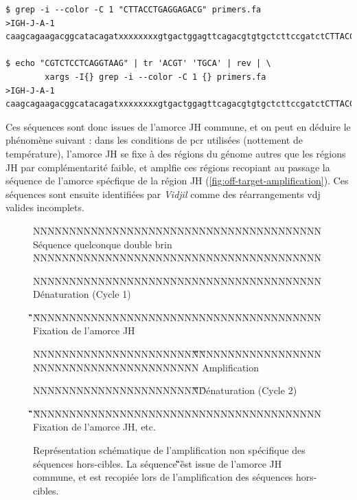 \begin{lstlisting}[language=custombash, 
caption={Commande Bash et résultat de la recherche des séquences dans les amorces dégénérées.},
label={lst:bash-search-primer},
basicstyle=\ttfamily\scriptsize]
$ grep -i --color -C 1 "CTTACCTGAGGAGACG" primers.fa
>IGH-J-A-1
caagcagaagacggcatacagatxxxxxxxxgtgactggagttcagacgtgtgctcttccgatctCTTACCTGAGGAGACGgtgacc

$ echo "CGTCTCCTCAGGTAAG" | tr 'ACGT' 'TGCA' | rev | \
        xargs -I{} grep -i --color -C 1 {} primers.fa
>IGH-J-A-1
caagcagaagacggcatacagatxxxxxxxxgtgactggagttcagacgtgtgctcttccgatctCTTACCTGAGGAGACGgtgacc
\end{lstlisting}

\vspace{1em}

Ces séquences sont donc issues de l'amorce JH commune, et on peut en déduire le phénomène suivant :
dans les conditions de \gls{pcr} utilisées (nottement de température), l'amorce JH se fixe à des régions 
du génome autres que les régions JH par complémentarité faible, et amplfie ces régions recopiant au passage 
la séquence de l'amorce spécfique de la région JH (\autoref{fig:off-target-amplification}). Ces séquences sont ensuite 
identifiées par \textit{Vidjil} comme des réarrangements \gls{vdj} valides incomplets. 

\begin{figure}[H]
    \centering
    \begin{ColoredVerbatim}
        
        NNNNNNNNNNNNNNNNNNNNNNNNNNNNNNNNNNNNNNNN Séquence quelconque double brin
        NNNNNNNNNNNNNNNNNNNNNNNNNNNNNNNNNNNNNNNN

        NNNNNNNNNNNNNNNNNNNNNNNNNNNNNNNNNNNNNNNN Dénaturation (Cycle 1)

                               \C\G\T\C\T\C\C\T\C\A\G\G\T\A\A\G
        NNNNNNNNNNNNNNNNNNNNNNNNNNNNNNNNNNNNNNNN Fixation de l'amorce JH


        NNNNNNNNNNNNNNNNNNNNNNN\C\G\T\C\T\C\C\T\C\A\G\G\T\A\A\G
        NNNNNNNNNNNNNNNNNNNNNNNNNNNNNNNNNNNNNNNN Amplification

        NNNNNNNNNNNNNNNNNNNNNNN\C\G\T\C\T\C\C\T\C\A\G\G\T\A\A\G Dénaturation (Cycle 2)

                               \C\G\T\C\T\C\C\T\C\A\G\G\T\A\A\G
        NNNNNNNNNNNNNNNNNNNNNNNNNNNNNNNNNNNNNNNN Fixation de l'amorce JH, etc.
    \end{ColoredVerbatim}
    \caption{
        Représentation schématique de l'amplification non spécifique des séquences hors-cibles. 
        La séquence \C\G\T\C\T\C\C\T\C\A\G\G\T\A\A\G est issue de l'amorce JH commune, et est recopiée 
        lors de l'amplification des séquences hors-cibles.
    }
    \label{fig:off-target-amplification}
\end{figure}

